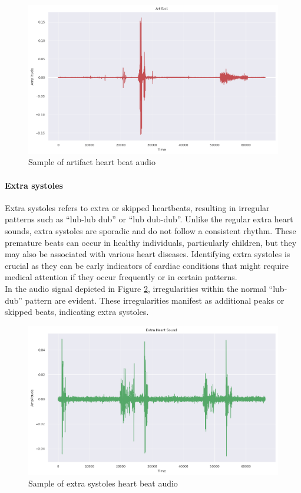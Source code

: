 \begin{figure}[H]
    \centering
    \includegraphics[width=.8\columnwidth]{../images/artifact_heart_beat_audio.png}
    \caption{Sample of artifact heart beat audio }\label{fig:artifact_heart_beat_audio}
\end{figure}

\paragraph{Extra systoles}
Extra systoles refers to extra or skipped heartbeats, resulting in irregular patterns such as ``lub-lub dub'' or ``lub dub-dub''.
Unlike the regular extra heart sounds, extra systoles are sporadic and do not follow a consistent rhythm.
These premature beats can occur in healthy individuals, particularly children, but they may also be associated with various heart diseases.
Identifying extra systoles is crucial as they can be early indicators of cardiac conditions that might require medical attention
if they occur frequently or in certain patterns.\\
In the audio signal depicted in Figure \ref{fig:extrastoles_heart_beat_audio}, irregularities within the normal “lub-dub” pattern are evident.
These irregularities manifest as additional peaks or skipped beats, indicating extra systoles.
\begin{figure}[H]
    \centering
    \includegraphics[width=.8\columnwidth]{../images/extrahls_heart_beat_audio.png}
    \caption{Sample of extra systoles heart beat audio }\label{fig:extrastoles_heart_beat_audio}
\end{figure}

